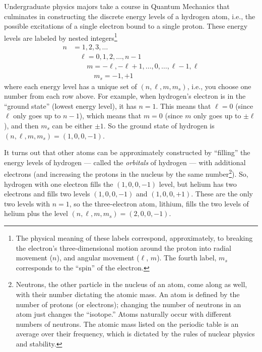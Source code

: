 \documentclass[12pt]{article}
\begin{document}
\begin{enumerate}
Undergraduate physics majors take a course in Quantum Mechanics that culminates in constructing the discrete energy levels of a hydrogen atom, i.e., the possible excitations of a single electron bound to a single proton.  These energy levels are labeled by nested integers\footnote{The physical meaning of these labels correspond, approximately, to breaking the electron's three-dimensional motion around the proton into radial movement ($n$), and angular movement ($\ell$, $m$). The fourth label, $m_s$ corresponds to the ``spin'' of the electron.}
		\begin{equation*}
		\begin{split}
		n &= 1, 2, 3, \ldots  \\
		 & \quad \ell = 0, 1, 2, \ldots, n-1 \\
		 & \quad \quad m = -\ell, -\ell + 1, \ldots, 0, \ldots, \ell - 1, \ell\\
		 & \quad \quad \quad m_s = -1, +1
		\end{split}
		\end{equation*}
	where each energy level has a unique set of $(n, \ell, m, m_s)$, i.e., you choose one number from each row above.  For example, when hydrogen's electron is in the ``ground state'' (lowest energy level), it has $n=1$.  This means that $\ell = 0$ (since $\ell$ only goes up to $n-1$), which means that $m=0$ (since $m$ only goes up to $\pm \ell$), and then $m_s$ can be either $\pm 1$.  So the ground state of hydrogen is $(n, \ell, m, m_s) = (1, 0, 0, -1)$. 
	
	  It turns out that other atoms can be approximately constructed by ``filling'' the energy levels of hydrogen --- called the {\em orbitals} of hydrogen --- with additional electrons (and increasing the protons in the nucleus by the same number\footnote{Neutrons, the other particle in the nucleus of an atom, come along as well, with their number dictating the atomic mass.  An atom is defined by the number of protons (or electrons); changing the number of neutrons in an atom just changes the ``isotope.''  Atoms naturally occur with different numbers of neutrons. The atomic mass listed on the periodic table is an average over their frequency, which is dictated by the rules of nuclear physics and stability.}).  So, hydrogen with one electron fills the  $(1, 0, 0, -1)$ level, but helium has two electrons and fills two levels $(1, 0, 0, -1)$ and $(1, 0, 0, +1)$.  These are the only two levels with $n=1$, so the three-electron atom, lithium, fills the two levels of helium plus the level $(n, \ell, m, m_s) = (2, 0, 0, -1)$. 



\end{enumerate}
\end{document}
